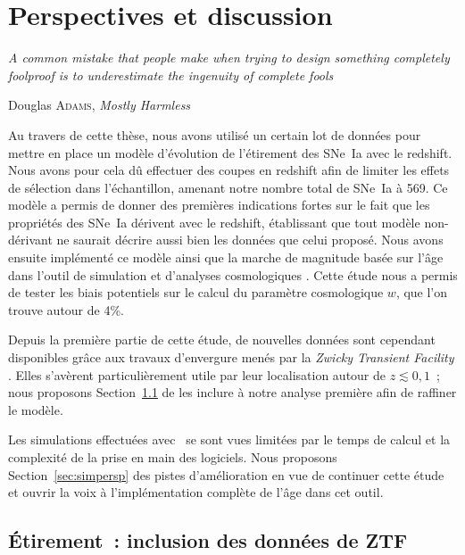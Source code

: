 \documentclass[../main/main.tex]{subfiles}
\begin{document}

\chapter{Perspectives et discussion}\label{ch:persp}
\epigraph{\openquote\textit{A common mistake that people make when trying to
design something completely foolproof is to underestimate the ingenuity of
complete fools}\closequote}{Douglas \textsc{Adams}, \textit{Mostly Harmless}}

Au travers de cette thèse, nous avons utilisé un certain lot de données pour
mettre en place un modèle d'évolution de l'étirement des SNe~Ia avec le
redshift. Nous avons pour cela dû effectuer des coupes en redshift afin de
limiter les effets de sélection dans l'échantillon, amenant notre nombre total
de SNe~Ia à 569. Ce modèle a permis de donner des premières indications fortes
sur le fait que les propriétés des SNe~Ia dérivent avec le redshift, établissant
que tout modèle non-dérivant ne saurait décrire aussi bien les données que celui
proposé. Nous avons ensuite implémenté ce modèle ainsi que la marche de
magnitude basée sur l'âge dans l'outil de simulation et d'analyses cosmologiques
\snana. Cette étude nous a permis de tester les biais potentiels sur le calcul
du paramètre cosmologique $w$, que l'on trouve autour de 4\%.

Depuis la première partie de cette étude, de nouvelles données sont cependant
disponibles grâce aux travaux d'envergure menés par la \textit{Zwicky Transient
Facility} \citep[ZTF,][]{bellm2019}. Elles s'avèrent particulièrement utile par
leur localisation autour de $z \lesssim 0,1$~; nous proposons
Section~\ref{sec:xztf} de les inclure à notre analyse première afin de raffiner
le modèle.

Les simulations effectuées avec \snana\ se sont vues limitées par le temps de
calcul et la complexité de la prise en main des logiciels. Nous proposons
Section~\ref{sec:simpersp} des pistes d'amélioration en vue de continuer cette
étude et ouvrir la voix à l'implémentation complète de l'âge dans cet outil.

\vfill
\minitoc
\vfill

\newpage

\section{Étirement~: inclusion des données de ZTF}\label{sec:xztf}
\end{document}
